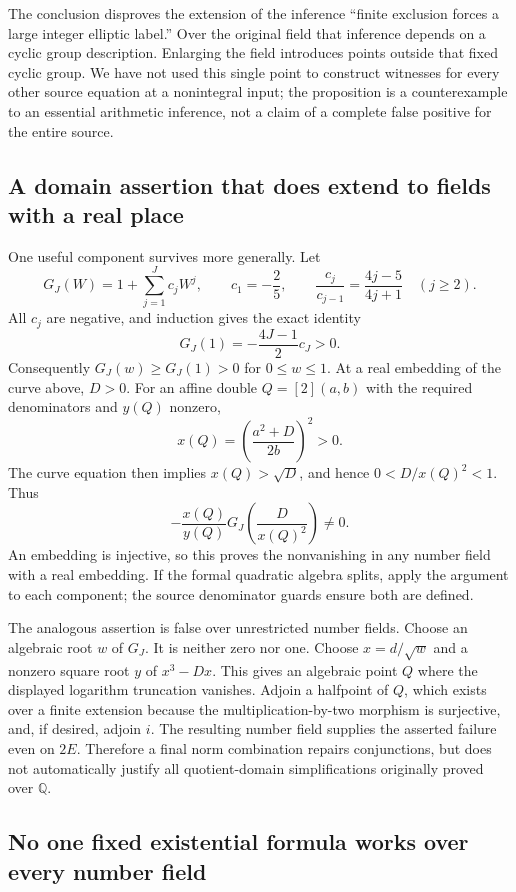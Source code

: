 The conclusion disproves the extension of the inference
``finite exclusion forces a large integer elliptic label.''
Over the original field that inference depends on a cyclic
group description.  Enlarging the field introduces points
outside that fixed cyclic group.  We have not used this
single point to construct witnesses for every other source
equation at a nonintegral input; the proposition is a
counterexample to an essential arithmetic inference, not a
claim of a complete false positive for the entire source.

\subsection{A domain assertion that does extend to fields with a real place}

One useful component survives more generally.  Let
\[
 G_J(W)=1+\sum_{j=1}^J c_jW^j,\qquad
 c_1=-\frac25,\qquad
 \frac{c_j}{c_{j-1}}=\frac{4j-5}{4j+1}\quad(j\ge2).
\]
All $c_j$ are negative, and induction gives the exact identity
\[
                        G_J(1)=-\frac{4J-1}{2}c_J>0.
\]
Consequently $G_J(w)\ge G_J(1)>0$ for $0\le w\le1$.
At a real embedding of the curve above, $D>0$.  For an
affine double $Q=[2](a,b)$ with the required denominators
and $y(Q)$ nonzero,
\[
                  x(Q)=\left(\frac{a^2+D}{2b}\right)^2>0.
\]
The curve equation then implies $x(Q)>\sqrt D$, and hence
$0<D/x(Q)^2<1$.  Thus
\[
             -\frac{x(Q)}{y(Q)}G_J\!\left(\frac D{x(Q)^2}\right)
                          \ne0.
\]
An embedding is injective, so this proves the nonvanishing
in any number field with a real embedding.  If the formal
quadratic algebra splits, apply the argument to each component;
the source denominator guards ensure both are defined.

The analogous assertion is false over unrestricted number
fields.  Choose an algebraic root $w$ of $G_J$.  It is neither
zero nor one.  Choose $x=d/\sqrt w$ and a nonzero square root
$y$ of $x^3-Dx$.  This gives an algebraic point $Q$ where the
displayed logarithm truncation vanishes.  Adjoin a halfpoint
of $Q$, which exists over a finite extension because the
multiplication-by-two morphism is surjective, and, if desired,
adjoin $i$.  The resulting number field supplies the asserted
failure even on $2E$.  Therefore a final norm combination
repairs conjunctions, but does not automatically justify all
quotient-domain simplifications originally proved over
$\mathbb Q$.

\subsection{No one fixed existential formula works over every number field}

